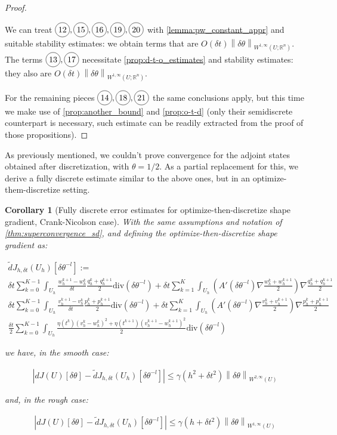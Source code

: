 \documentclass[english,a4paper,9pt,oneside]{scrbook}	%
\theoremstyle{break}
\newtheorem{cor}[equation]{Corollary}
\newenvironment{mproof}[1][\proofname]{%
  \begin{proof}[#1]$ $\par\nobreak\ignorespaces
}{%
  \end{proof}
}
\renewcommand*{\proofname}{Proof}
\theoremstyle{remark}
\newcommand{\mR}{\mathbb{R}}
\newcommand{\norm}[1]{\left\lVert#1\right\rVert}
\newcommand{\te}{\theta}
\newcommand{\dive}{\text{div}}
\newcommand*\circled[1]{\tikz[baseline=(char.base)]{
            \node[shape=circle,draw,inner sep=2pt] (char) {#1};}}
\begin{document}
\begin{mproof}
We can treat $\circled{12},\circled{15},\circled{16},\circled{19},\circled{20}$ with \cref{lemma:pw_constant_appr} and suitable stability estimates: we obtain terms that are $O(\delta t)\norm{\delta \te}_{W^{1,\infty}(U;\mR^n)}$. 
The terms $\circled{13},\circled{17}$ necessitate \cref{prop:d-t-o_estimates} and stability estimates: they also are $O(\delta t)\norm{\delta \te}_{W^{1,\infty}(U;\mR^n)}$. 

For the remaining pieces  $\circled{14},\circled{18},\circled{21}$ the same conclusions apply, but this time we make use of \cref{prop:another_bound} and \cref{prop:o-t-d} (only their semidiscrete counterpart is necessary, such estimate can be readily extracted from the proof of those propositions).
\end{mproof}

As previously mentioned, we couldn't prove convergence for the adjoint states obtained after discretization, with $\te = 1/2$. As a partial replacement for this, we derive a fully discrete estimate similar to the above ones, but in an optimize-them-discretize setting.

\begin{cor}[Fully discrete error estimates for optimize-then-discretize shape gradient, Crank-Nicolson case]
\label{cor:superconvergence_sd_fd_CN}
With the same assumptions and notation of \cref{thm:superconvergence_sd}, and defining the optimize-then-discretize shape gradient as:

\begin{align*}
\tilde{d} J_{h,\delta t} (U_h)[\delta \te^{-l}]:=\\
\delta t \sum_{k=0}^{K-1} \int_{U_h} \frac{w_h^{k+1}-w_h^{k}}{\delta t}\frac{q_h^k+q_h^{k+1}}{2} \dive(\delta \te^{-l})+\delta t \sum_{k=1}^K \int_{U_h} \left(A'(\delta \te^{-l})\nabla \frac{w_h^k+ w_h^{k+1}}{2} \right )\nabla \frac{q_h^{k}+q_h^{k+1}}{2}\\
\delta t \sum_{k=0}^{K-1} \int_{U_h} \frac{v_h^{k+1}-v_h^{k}}{\delta t}\frac{p_h^k+p_h^{k+1}}{2} \dive(\delta \te^{-l})+\delta t \sum_{k=1}^K \int_{U_h} \left(A'(\delta \te^{-l})\nabla \frac{v_h^k+ v_h^{k+1}}{2} \right )\nabla \frac{p_h^{k}+p_h^{k+1}}{2}\\
\frac{\delta t}{2} \sum_{k=0}^{K-1} \int_{U_h}\frac{\eta(t^k)(v_h^k-w_h^k)^2 + \eta(t^{k+1})(v_h^{k+1}-w_h^{k+1})^2}{2}\dive(\delta \te^{-l})
\end{align*}

we have, in the smooth case:

\begin{align*}
	\left |dJ(U)[\delta \te] - \tilde{d}J_{h,\delta t}(U_h)[\delta \te^{-l}] \right|\leq \gamma  (h^2 + \delta t^2)\norm{\delta \te}_{W^{2,\infty}(U)}
\end{align*}

and, in the rough case:

\begin{align*}
	\left |dJ(U)[\delta \te] - \tilde{d}J_{h,\delta t}(U_h)[\delta \te^{-l}] \right|\leq \gamma  (h + \delta t^2)\norm{\delta \te}_{W^{1,\infty}(U)}
\end{align*}

\end{cor}
\end{document}
